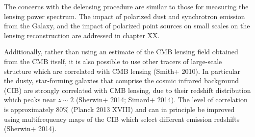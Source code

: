 \documentclass[prd,superscriptaddress,nofootinbib,floatfix,notitlepage]{revtex4-1}
\begin{document}
The concerns with the delensing procedure are similar to those for measuring the lensing power spectrum. The impact of polarized dust and synchrotron emission from the Galaxy, and the impact of polarized point sources on small scales on the lensing reconstruction are addressed in chapter XX. 

Additionally, rather than using an estimate of the CMB lensing field obtained from the CMB itself, it is also possible to use other tracers of large-scale structure which are correlated with  CMB lensing (Smith+ 2010).  In particular the dusty, star-forming galaxies that comprise the cosmic infrared background (CIB) are strongly correlated with CMB lensing, due to their redshift distribution which peaks near $z \sim 2$ (Sherwin+ 2014; Simard+ 2014).  The level of correlation is approximately $80\%$ (Planck 2013 XVIII) and can in principle be improved using multifrequency maps of the CIB which select different emission redshifts (Sherwin+ 2014).  



\end{document}
